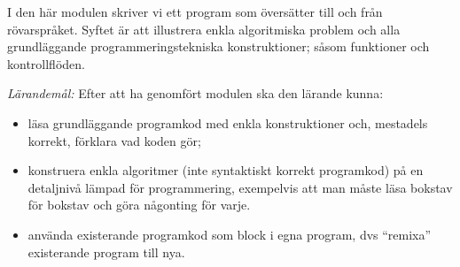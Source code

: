 
I den här modulen skriver vi ett program som översätter till och från 
rövarspråket.
Syftet är att illustrera enkla algoritmiska problem och alla grundläggande 
programmeringstekniska konstruktioner; såsom funktioner och kontrollflöden.

\emph{Lärandemål:}
Efter att ha genomfört modulen ska den lärande kunna:
\begin{itemize}
  \item läsa grundläggande programkod med enkla konstruktioner
    och, mestadels korrekt, förklara vad koden gör;
  \item konstruera enkla algoritmer (inte syntaktiskt korrekt programkod) på en 
    detaljnivå lämpad för programmering, exempelvis att man måste läsa bokstav 
    för bokstav och göra någonting för varje.
  \item använda existerande programkod som block i egna program, dvs 
    \enquote{remixa} existerande program till nya.
\end{itemize}
